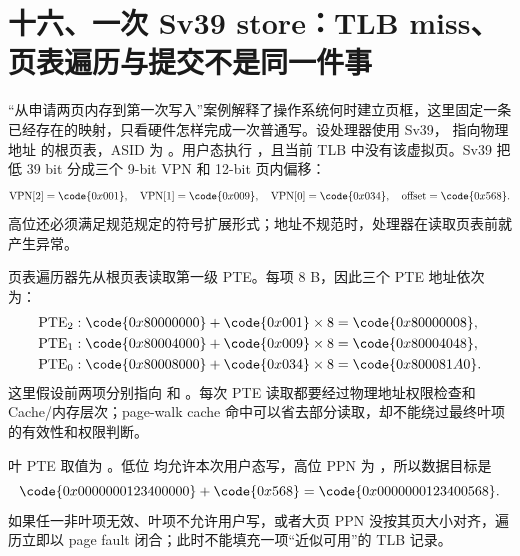 \section{十六、一次 Sv39 store：TLB miss、页表遍历与提交不是同一件事}

“从申请两页内存到第一次写入”案例解释了操作系统何时建立页框，这里固定一条已经存在的映射，只看硬件怎样完成一次普通写。设处理器使用 Sv39， 指向物理地址  的根页表，ASID 为 。用户态执行 ，且当前 TLB 中没有该虚拟页。Sv39 把低 39 bit 分成三个 9-bit VPN 和 12-bit 页内偏移：
\[
\mathrm{VPN}[2]=\code{0x001},\quad
\mathrm{VPN}[1]=\code{0x009},\quad
\mathrm{VPN}[0]=\code{0x034},\quad
\mathrm{offset}=\code{0x568}.
\]
高位还必须满足规范规定的符号扩展形式；地址不规范时，处理器在读取页表前就产生异常。\cite{riscv-priv}


页表遍历器先从根页表读取第一级 PTE。每项 8 B，因此三个 PTE 地址依次为：
\[
\begin{aligned}
\mathrm{PTE}_2 &: \code{0x80000000}+\code{0x001}\times8=\code{0x80000008},\\
\mathrm{PTE}_1 &: \code{0x80004000}+\code{0x009}\times8=\code{0x80004048},\\
\mathrm{PTE}_0 &: \code{0x80008000}+\code{0x034}\times8=\code{0x800081A0}.
\end{aligned}
\]
这里假设前两项分别指向  和 。每次 PTE 读取都要经过物理地址权限检查和 Cache/内存层次；page-walk cache 命中可以省去部分读取，却不能绕过最终叶项的有效性和权限判断。

叶 PTE 取值为 。低位  均允许本次用户态写，高位 PPN 为 ，所以数据目标是
\[
\code{0x0000000123400000}+\code{0x568}
=\code{0x0000000123400568}.
\]
如果任一非叶项无效、叶项不允许用户写，或者大页 PPN 没按其页大小对齐，遍历立即以 page fault 闭合；此时不能填充一项“近似可用”的 TLB 记录。

